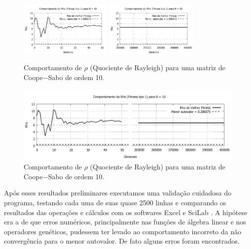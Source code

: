 	\begin{figure}[htbp]
		\centering
			\includegraphics[width=0.40\textwidth]{figs/resultados/rho_N10_g50.pdf}
			\includegraphics[width=0.40\textwidth]{figs/resultados/rho_N10_g400000.pdf}
		\caption{Comportamento de $\rho$ (Quociente de Rayleigh) para uma matriz de Coope$-$Sabo de ordem 10.}
		\label{fig:rho_N10}
	\end{figure}
	
	\newpage
	\begin{landscape}
	\begin{figure}[p]
		\centering
			\includegraphics[width=1.3\textwidth]{figs/resultados/rho_N10.png}
		\caption{Comportamento de $\rho$ (Quociente de Rayleigh) para uma matriz de Coope$-$Sabo de ordem 10.}
		\label{fig:rho_N10_completa}
	\end{figure}
	\end{landscape}
	\newpage
			
	Após esses resultados preliminares executamos uma validação cuidadosa do programa, testando cada uma de suas quase 2500 linhas e comparando os resultados das operações e cálculos com os softwares Excel \cite{excel} e SciLab \cite{scilab}. A hipótese era a de que erros numéricos, principalmente nas funções de álgebra linear e nos operadores genéticos, pudessem ter levado ao comportamento incorreto da não convergência para o menor autovalor. De fato alguns erros foram encontrados.
	
